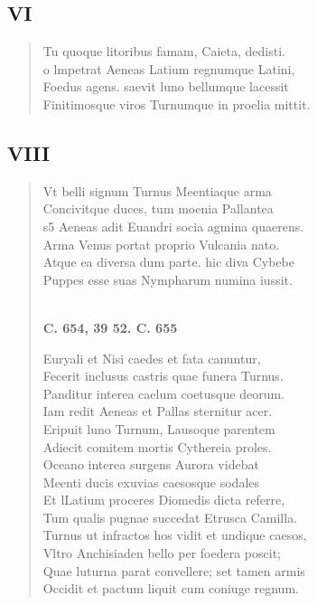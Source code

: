 \documentclass[11pt, a4paper]{report}
\begin{document}
\begin{verse}
      \end{verse}
  
            \subsection*{VI}
      \begin{verse}
      Tu quoque litoribus famam, Caieta, dedisti. \\ o lmpetrat Aeneas Latium regnumque Latini, \\ Foedus agens. saevit luno bellumque lacessit \\ Finitimosque viros Turnumque in proelia mittit. \\ 
      \end{verse}
  
            \subsection*{VIII}
      \begin{verse}
      Vt belli signum Turnus \rbrack  Meentiaque arma \\ Concivitque duces, tum moenia Pallantea \\ s5 Aeneas adit Euandri socia agmina quaerens. \\ Arma Venus portat proprio Vulcania nato. \\ Atque ea diversa dum parte. \rbrack  hic diva Cybebe \\ Puppes esse suas Nympharum numina iussit. \\ 
        ﻿\pagebreak 
    \begin{center} \textbf{C. 654, 39 52. C. 655} \end{center} \marginpar{[128]} Euryali et Nisi caedes et fata canuntur, \\ Fecerit inclusus castris quae funera Turnus. \\ Panditur interea \rbrack  caelum coetusque deorum. \\ Iam redit Aeneas et Pallas sternitur acer. \\ Eripuit luno Turnum, Lausoque parentem \\ Adiecit comitem mortis Cythereia proles. \\ Oceano interea surgens Aurora \rbrack  videbat \\ Meenti ducis exuvias caesosque sodales \\ Et lLatium proceres Diomedis dicta referre, \\ Tum qualis pugnae succedat Etrusca Camilla. \\ Turnus ut infractos \rbrack   \lbrack hos \rbrack  vidit et undique caesos, \\ Vltro Anchisiaden bello per foedera poscit; \\ Quae luturna parat convellere; set tamen armis \\ Occidit et pactum liquit cum coniuge regnum. \\ 
      \end{verse}
  
\end{document}
